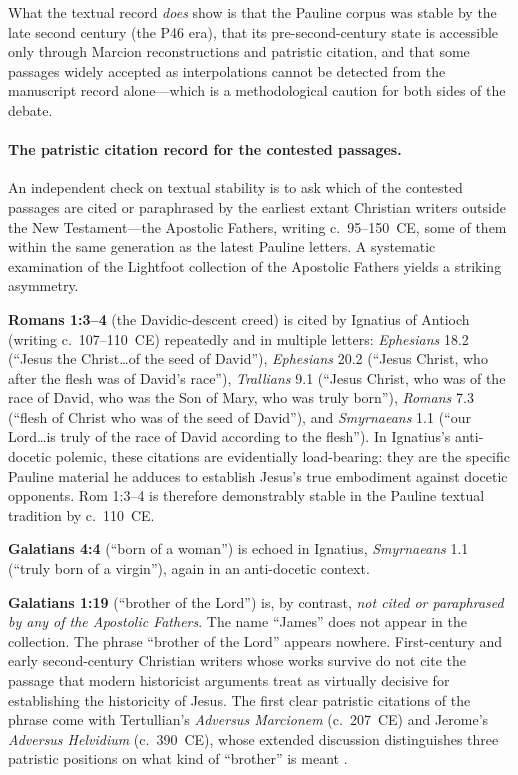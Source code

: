 \documentclass[12pt,oneside]{article}
\begin{document}
What the textual record \textit{does} show is that the Pauline
corpus was stable by the late second century (the P46 era), that
its pre-second-century state is accessible only through Marcion
reconstructions and patristic citation, and that some passages
widely accepted as interpolations cannot be detected from the
manuscript record alone---which is a methodological caution for
both sides of the debate.

\paragraph{The patristic citation record for the contested
passages.}
An independent check on textual stability is to ask which of the
contested passages are cited or paraphrased by the earliest
extant Christian writers outside the New Testament---the
Apostolic Fathers, writing c.~95--150~CE, some of them within the
same generation as the latest Pauline letters.  A systematic
examination of the Lightfoot collection of the Apostolic Fathers
yields a striking asymmetry.

\textbf{Romans 1:3--4} (the Davidic-descent creed) is cited by
Ignatius of Antioch (writing c.~107--110~CE) repeatedly and in
multiple letters: \textit{Ephesians} 18.2 (\enquote{Jesus the
Christ\ldots of the seed of David}), \textit{Ephesians} 20.2
(\enquote{Jesus Christ, who after the flesh was of David's
race}), \textit{Trallians} 9.1 (\enquote{Jesus Christ, who was
of the race of David, who was the Son of Mary, who was truly
born}), \textit{Romans} 7.3 (\enquote{flesh of Christ who was of
the seed of David}), and \textit{Smyrnaeans} 1.1 (\enquote{our
Lord\ldots is truly of the race of David according to the
flesh}).  In Ignatius's anti-docetic polemic, these citations are
evidentially load-bearing: they are the specific Pauline material
he adduces to establish Jesus's true embodiment against docetic
opponents.  Rom 1:3--4 is therefore demonstrably stable in the
Pauline textual tradition by c.~110~CE.

\textbf{Galatians 4:4} (\enquote{born of a woman}) is echoed in
Ignatius, \textit{Smyrnaeans} 1.1 (\enquote{truly born of a
virgin}), again in an anti-docetic context.

\textbf{Galatians 1:19} (\enquote{brother of the Lord}) is, by
contrast, \textit{not cited or paraphrased by any of the
Apostolic Fathers}.  The name \enquote{James} does not appear in
the collection.  The phrase \enquote{brother of the Lord} appears
nowhere.  First-century and early second-century Christian
writers whose works survive do not cite the passage that modern
historicist arguments treat as virtually decisive for
establishing the historicity of Jesus.  The first clear patristic
citations of the phrase come with Tertullian's \textit{Adversus
Marcionem} (c.~207~CE) and Jerome's \textit{Adversus Helvidium}
(c.~390~CE), whose extended discussion distinguishes three
patristic positions on what kind of \enquote{brother} is meant
\citep{Lightfoot1869}.
\end{document}
